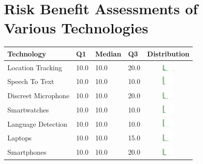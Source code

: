 \onecolumn
\section{Risk Benefit Assessments of Various Technologies}
\label{sec:riskben-appendix} 
\twocolumn
\begin{table}[h!!!!]
\begin{center}
\small
\begin{tabular}{| p{2cm} | p{1cm} | p{1cm} | p{1cm} | c |}
\hline
Technology & Q1 &  Median & Q3 & Distribution  \\ 
\hline
Location Tracking & 10.0 & 10.0 & 20.0 & \includegraphics[width = 2cm, height = 0.5cm]{tex-inputs/table-images/locationtrackingrisk} \\ 
Speech To Text & 10.0 & 10.0 & 10.0 & \includegraphics[width = 2cm, height = 0.5cm]{tex-inputs/table-images/speechtotextrisk} \\ 
Discreet Microphone & 10.0 & 10.0 & 20.0 & \includegraphics[width = 2cm, height = 0.5cm]{tex-inputs/table-images/discreetmicrophonerisk} \\ 
Smartwatches & 10.0 & 10.0 & 10.0 & \includegraphics[width = 2cm, height = 0.5cm]{tex-inputs/table-images/smartwatchesrisk} \\ 
Language Detection & 10.0 & 10.0 & 10.0 & \includegraphics[width = 2cm, height = 0.5cm]{tex-inputs/table-images/languagedetectionrisk} \\ 
Laptops & 10.0 & 10.0 & 15.0 & \includegraphics[width = 2cm, height = 0.5cm]{tex-inputs/table-images/laptopsrisk} \\ 
Smartphones & 10.0 & 10.0 & 20.0 & \includegraphics[width = 2cm, height = 0.5cm]{tex-inputs/table-images/smartphonesrisk} \\ 

\end{tabular}
\end{center}
\end{table}
